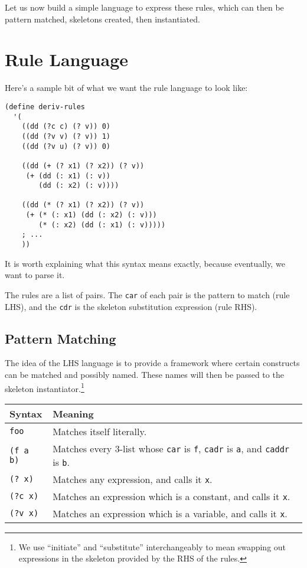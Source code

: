 \documentclass[9pt]{report}
\begin{document}
Let us now build a simple language to express these rules, which can
then be pattern matched, skeletons created, then instantiated.

\section{Rule Language}
\label{sec:org0da02fb}

Here's a sample bit of what we want the rule language to look like:

\begin{verbatim}
(define deriv-rules
  '(
    ((dd (?c c) (? v)) 0)
    ((dd (?v v) (? v)) 1)
    ((dd (?v u) (? v)) 0)

    ((dd (+ (? x1) (? x2)) (? v))
     (+ (dd (: x1) (: v))
        (dd (: x2) (: v))))

    ((dd (* (? x1) (? x2)) (? v))
     (+ (* (: x1) (dd (: x2) (: v)))
        (* (: x2) (dd (: x1) (: v)))))
    ; ...
    ))
\end{verbatim}

It is worth explaining what this syntax means exactly, because
eventually, we want to parse it.

The rules are a list of pairs. The \texttt{car} of each pair is the
pattern to match (rule LHS), and the \texttt{cdr} is the skeleton
substitution expression (rule RHS).

\subsection{Pattern Matching}
\label{sec:org6f8fc5f}

The idea of the LHS language is to provide a framework where
certain constructs can be matched and possibly named. These names
will then be passed to the skeleton instantiator.\footnote{We use ``initiate'' and ``substitute'' interchangeably to mean
swapping out expressions in the skeleton provided by the RHS of the
rules.}

\begin{center}
\begin{tabular}{ll}
\toprule
Syntax & Meaning\\
\midrule
\texttt{foo} & Matches itself literally.\\
\texttt{(f a b)} & Matches every 3-list whose \texttt{car} is \texttt{f}, \texttt{cadr} is \texttt{a}, and \texttt{caddr} is \texttt{b}.\\
\texttt{(? x)} & Matches any expression, and calls it \texttt{x}.\\
\texttt{(?c x)} & Matches an expression which is a constant, and calls it \texttt{x}.\\
\texttt{(?v x)} & Matches an expression which is a variable, and calls it \texttt{x}.\\
\bottomrule
\end{tabular}
\end{center}
\end{document}
